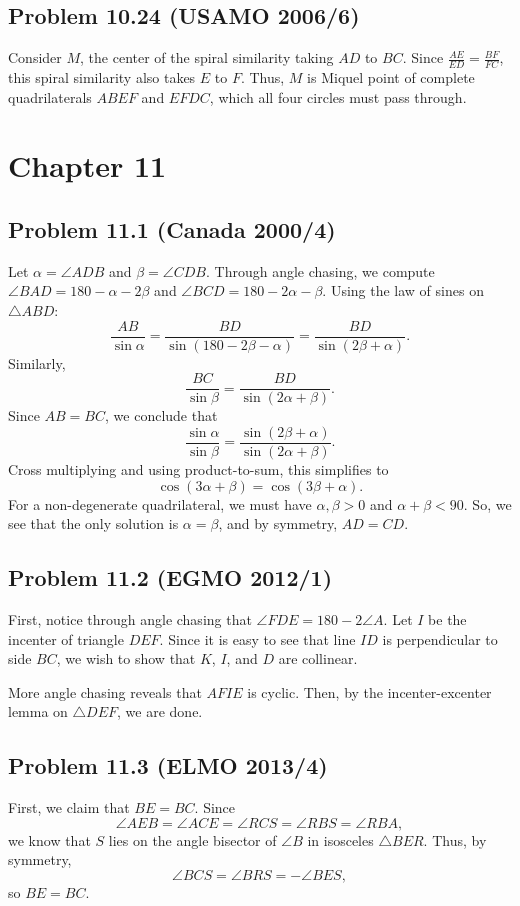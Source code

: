\documentclass{scrartcl}
\begin{document}
\subsection*{Problem 10.24 (USAMO 2006/6)}
Consider $M$, the center of the spiral similarity taking $AD$ to $BC$. Since $\frac{AE}{ED} = \frac{BF}{FC}$, this
spiral similarity also takes $E$ to $F$. Thus, $M$ is Miquel point of complete quadrilaterals $ABEF$ and $EFDC$,
which all four circles must pass through.

\section*{Chapter 11}
\subsection*{Problem 11.1 (Canada 2000/4)}
Let $\alpha = \angle ADB$ and $\beta = \angle CDB$. Through angle chasing, we compute $\angle BAD = 180 - \alpha - 2\beta$
and $\angle BCD = 180 - 2\alpha - \beta$. Using the law of sines on $\triangle ABD$:
\[ \frac{AB}{\sin \alpha} = \frac{BD}{\sin (180 - 2\beta - \alpha)} = \frac{BD}{\sin (2\beta + \alpha)}. \]
Similarly,
\[ \frac{BC}{\sin \beta} = \frac{BD}{\sin (2\alpha + \beta)}. \]
Since $AB = BC$, we conclude that
\[ \frac{\sin \alpha}{\sin \beta} = \frac{\sin (2\beta + \alpha)}{\sin (2\alpha + \beta)}. \]
Cross multiplying and using product-to-sum, this simplifies to
\[ \cos(3\alpha + \beta) = \cos(3\beta + \alpha). \]
For a non-degenerate quadrilateral, we must have $\alpha, \beta > 0$ and $\alpha + \beta < 90$. So, we see that the only
solution is $\alpha = \beta$, and by symmetry, $AD = CD$.

\subsection*{Problem 11.2 (EGMO 2012/1)}
First, notice through angle chasing that $\angle FDE = 180 - 2\angle A$. Let $I$ be the incenter of triangle $DEF$.
Since it is easy to see that line $ID$ is perpendicular to side $BC$, we wish to show that $K$, $I$, and $D$ are
collinear.

More angle chasing reveals that $AFIE$ is cyclic. Then, by the incenter-excenter lemma on $\triangle DEF$, we are done.

\subsection*{Problem 11.3 (ELMO 2013/4)}
First, we claim that $BE = BC$. Since
\[ \angle AEB = \angle ACE = \angle RCS = \angle RBS = \angle RBA, \]
we know that $S$ lies on the angle bisector of $\angle B$ in isosceles $\triangle BER$. Thus, by symmetry,
\[ \angle BCS = \angle BRS = -\angle BES, \]
so $BE = BC$.
\end{document}
